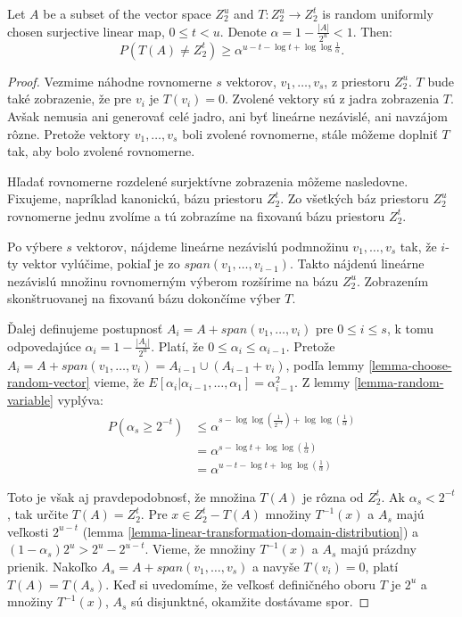 \begin{theorem}
\label{theorem-linear-function-set-onto}
Let $A$ be a subset of the vector space $Z_2^u$ and $T: Z_2^u \rightarrow Z_2^t$ is random uniformly chosen surjective linear map, $0 \leq t < u$. Denote $\alpha = 1 - \frac{|A|}{2^u} < 1$. Then:
\begin{displaymath}
P(T(A) \neq Z_2^t) \geq \alpha^{u - t - \log t + \log \log \frac{1}{\alpha}} \textit{.}
\end{displaymath}
\end{theorem}
\begin{proof}
Vezmime náhodne rovnomerne $s$ vektorov, $v_1, \dots, v_s$, z priestoru $Z_2^u$. $T$ bude také zobrazenie, že pre $v_i$ je $T(v_i) = 0$. Zvolené vektory sú z jadra zobrazenia $T$. Avšak nemusia ani generovať celé jadro, ani byť lineárne nezávislé, ani navzájom rôzne. Pretože vektory $v_1, \dots, v_s$ boli zvolené rovnomerne, stále môžeme doplniť $T$ tak, aby bolo zvolené rovnomerne. 

Hľadať rovnomerne rozdelené surjektívne zobrazenia môžeme nasledovne. Fixujeme, napríklad kanonickú, bázu priestoru $Z_2^t$. Zo všetkých báz priestoru $Z_2^u$ rovnomerne jednu zvolíme a tú zobrazíme na fixovanú bázu priestoru $Z_2^t$. 

Po výbere $s$ vektorov, nájdeme lineárne nezávislú podmnožinu $v_1, \dots, v_s$ tak, že $i$-ty vektor vylúčime, pokiaľ je zo $span(v_1, \dots, v_{i-1})$. Takto nájdenú lineárne nezávislú množinu rovnomerným výberom rozšírime na bázu $Z_2^u$. Zobrazením skonštruovanej na fixovanú bázu dokončíme výber $T$.

Ďalej definujeme postupnosť $A_i = A + span(v_1, \dots, v_i)$ pre $0 \leq i \leq s$, k tomu odpovedajúce $\alpha_i = 1 - \frac{|A_i|}{2^u}$. Platí, že $0 \leq \alpha_i \leq \alpha_{i-1}$. Pretože $A_{i} = A + span(v_1, \dots, v_i) = A_{i-1} \cup (A_{i-1} + v_i)$, podľa lemmy \ref{lemma-choose-random-vector} vieme, že $E[\alpha_i | \alpha_{i-1}, \dots, \alpha_1] = \alpha_{i-1}^2$. Z lemmy \ref{lemma-random-variable} vyplýva:
\begin{displaymath}
\begin{split}
P(\alpha_s \geq 2^{-t}) 
	& \leq \alpha^{s - \log \log (\frac{1}{2^{-t}}) + \log \log (\frac{1}{\alpha})} \\
	& = \alpha^{s - \log t + \log \log (\frac{1}{\alpha})} \\
	& = \alpha^{u - t - \log t + \log \log (\frac{1}{\alpha})}
\end{split}
\end{displaymath}

Toto je však aj pravdepodobnosť, že množina $T(A)$ je rôzna od $Z_2^t$. Ak $\alpha_s < 2^{-t}$, tak určite $T(A) = Z_2^t$. Pre $x \in Z_2^t - T(A)$ množiny $T^{-1}(x)$ a $A_s$ majú veľkosti $2^{u-t}$ (lemma \ref{lemma-linear-transformation-domain-distribution}) a $(1 - \alpha_s)2^u > 2^u - 2^{u-t}$. Vieme, že množiny $T^{-1}(x)$ a $A_s$ majú prázdny prienik. Nakoľko $A_s = A + span(v_1, \dots, v_s)$ a navyše $T(v_i) = 0$, platí $T(A) = T(A_s)$. Keď si uvedomíme, že veľkosť definičného oboru $T$ je $2^u$ a množiny $T^{-1}(x)$, $A_s$ sú disjunktné, okamžite dostávame spor.
\end{proof}

